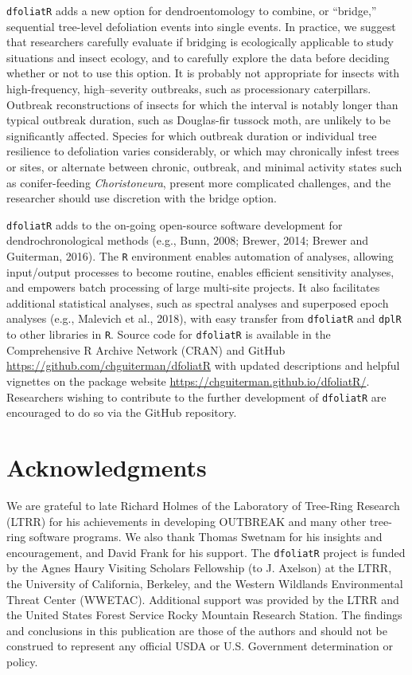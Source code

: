 \documentclass[review]{elsarticle} %
\begin{document}
\texttt{dfoliatR} adds a new option for dendroentomology to combine, or ``bridge,'' sequential tree-level defoliation events into single events. In practice, we suggest that researchers carefully evaluate if bridging is ecologically applicable to study situations and insect ecology, and to carefully explore the data before deciding whether or not to use this option. It is probably not appropriate for insects with high-frequency, high--severity outbreaks, such as processionary caterpillars. Outbreak reconstructions of insects for which the interval is notably longer than typical outbreak duration, such as Douglas-fir tussock moth, are unlikely to be significantly affected. Species for which outbreak duration or individual tree resilience to defoliation varies considerably, or which may chronically infest trees or sites, or alternate between chronic, outbreak, and minimal activity states such as conifer-feeding \emph{Choristoneura}, present more complicated challenges, and the researcher should use discretion with the bridge option.

\texttt{dfoliatR} adds to the on-going open-source software development for dendrochronological methods (e.g., Bunn, 2008; Brewer, 2014; Brewer and Guiterman, 2016). The \texttt{R} environment enables automation of analyses, allowing input/output processes to become routine, enables efficient sensitivity analyses, and empowers batch processing of large multi-site projects. It also facilitates additional statistical analyses, such as spectral analyses and superposed epoch analyses (e.g., Malevich et al., 2018), with easy transfer from \texttt{dfoliatR} and \texttt{dplR} to other libraries in \texttt{R}. Source code for \texttt{dfoliatR} is available in the Comprehensive R Archive Network (CRAN) and GitHub \url{https://github.com/chguiterman/dfoliatR} with updated descriptions and helpful vignettes on the package website \url{https://chguiterman.github.io/dfoliatR/}. Researchers wishing to contribute to the further development of \texttt{dfoliatR} are encouraged to do so via the GitHub repository.

\hypertarget{acknowledgments}{%
\section*{Acknowledgments}\label{acknowledgments}}

We are grateful to late Richard Holmes of the Laboratory of Tree-Ring Research (LTRR) for his achievements in developing OUTBREAK and many other tree-ring software programs. We also thank Thomas Swetnam for his insights and encouragement, and David Frank for his support. The \texttt{dfoliatR} project is funded by the Agnes Haury Visiting Scholars Fellowship (to J. Axelson) at the LTRR, the University of California, Berkeley, and the Western Wildlands Environmental Threat Center (WWETAC). Additional support was provided by the LTRR and the United States Forest Service Rocky Mountain Research Station. The findings and conclusions in this publication are those of the authors and should not be construed to represent any official USDA or U.S. Government determination or policy.
\end{document}

